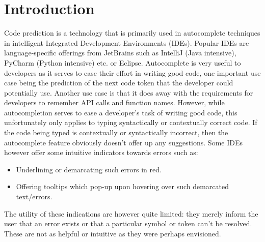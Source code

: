 \documentclass[sigplan,screen,9pt]{acmart}
\begin{document}
\section{Introduction}
Code prediction is a technology that is primarily used in autocomplete techniques in intelligent Integrated Development Environments (IDEs). Popular IDEs are language-specific offerings from JetBrains such as IntelliJ (Java intensive), PyCharm (Python intensive) etc. or Eclipse. Autocomplete is very useful to developers as it serves to ease their effort in writing good code, one important use case being the prediction of the next code token that the developer could potentially use. Another use case is that it does away with the requirements for developers to remember API calls and function names.\cite{FeedTree}
\newline
However, while autocompletion serves to ease a developer's task of writing good code, this unfortunately only applies to typing syntactically or contextually correct code. If the code being typed is contextually or syntactically incorrect, then the autocomplete feature obviously doesn't offer up any suggestions. Some IDEs however offer some intuitive indicators towards errors such as:
\begin{itemize}
    \item Underlining or demarcating such errors in red.
    \item Offering tooltips which pop-up upon hovering over such demarcated text/errors.
\end{itemize}
The utility of these indications are however quite limited: they merely inform the user that an error exists or that a particular symbol or token can't be resolved. These are not as helpful or intuitive as they were perhaps envisioned.
\end{document}
